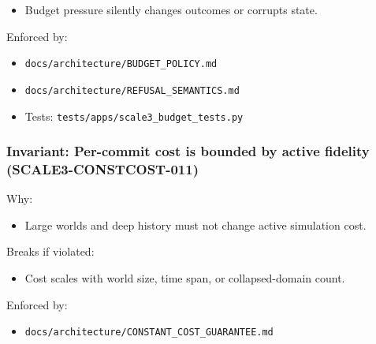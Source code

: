\documentclass[9pt,a4paper,openany]{book}
\begin{document}
\begin{itemize}
\item Budget pressure silently changes outcomes or corrupts state.\allowbreak{}
\end{itemize}


Enforced by:



\begin{itemize}
\item \texttt{docs/\allowbreak{}architecture/\allowbreak{}BUDGET\_\allowbreak{}POLICY.\allowbreak{}md}
\end{itemize}


\begin{itemize}
\item \texttt{docs/\allowbreak{}architecture/\allowbreak{}REFUSAL\_\allowbreak{}SEMANTICS.\allowbreak{}md}
\end{itemize}


\begin{itemize}
\item Tests: \texttt{tests/\allowbreak{}apps/\allowbreak{}scale3\_\allowbreak{}budget\_\allowbreak{}tests.\allowbreak{}py}
\end{itemize}





\subsubsection{Invariant: Per-commit cost is bounded by active fidelity (SCALE3-CONSTCOST-011)}


Why:



\begin{itemize}
\item Large worlds and deep history must not change active simulation cost.\allowbreak{}
\end{itemize}


Breaks if violated:



\begin{itemize}
\item Cost scales with world size, time span, or collapsed-\allowbreak{}domain count.\allowbreak{}
\end{itemize}


Enforced by:



\begin{itemize}
\item \texttt{docs/\allowbreak{}architecture/\allowbreak{}CONSTANT\_\allowbreak{}COST\_\allowbreak{}GUARANTEE.\allowbreak{}md}
\end{itemize}
\end{document}

